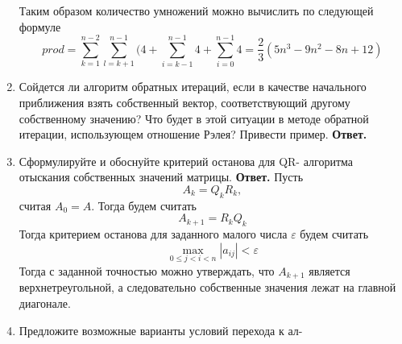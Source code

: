 \documentclass{article}
\begin{document}
\begin{enumerate}
	Таким образом количество умножений можно вычислить по следующей формуле 
	\[
	prod = \sum_{k=1}^{n-2} \sum_{l=k+1}^{n-1} (4+\sum_{i=k-1}^{n-1} 4 + \sum_{i=0}^{n-1} 4=\frac{2}{3} (5n^3-9n^2-8n+12)
	\]
        \item Сойдется ли алгоритм обратных итераций, если в качестве
        начального приближения взять собственный вектор, соответствующий
         другому собственному значению? Что будет
        в этой ситуации в методе обратной итерации, использующем
        отношение Рэлея? Привести пример.
        \newline 
        {\bfseries Ответ. } 
        \item Сформулируйте и обоснуйте критерий останова для QR-
        алгоритма отыскания собственных значений матрицы.
        \newline
        {\bfseries Ответ. } 
        Пусть 
        \begin{equation*}
            A_k = Q_k R_k,
        \end{equation*}
        считая $A_0 = A$.
        Тогда будем считать 
        \begin{equation*}
            A_{k+1} = R_{k} Q_{k}
        \end{equation*}
        Тогда критерием останова для заданного малого числа $\varepsilon$ 
        будем считать 
        \begin{equation*}
            \max_{0 \leqslant j<i<n} |a_{ij}| < \varepsilon
        \end{equation*}
        Тогда с заданной точностью можно утверждать, что $A_{k+1}$ является верхнетреугольной, а 
        следовательно собственные значения лежат на главной диагонале. 
        \item Предложите возможные варианты условий перехода к ал-

\end{enumerate}
\end{document}
